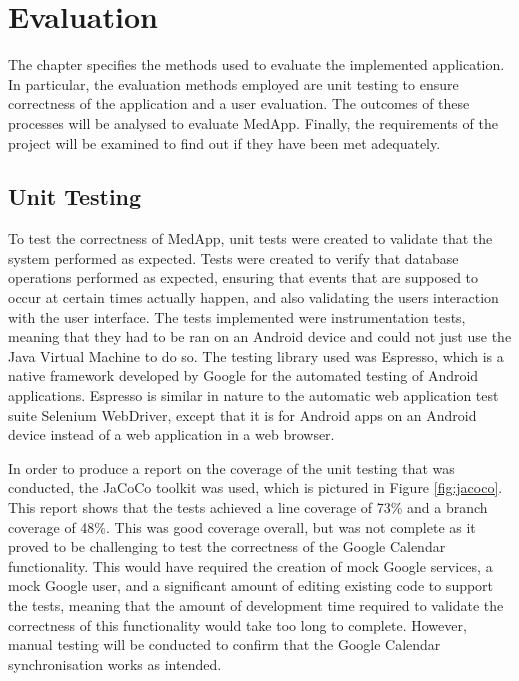\documentclass{l4proj}
\begin{document}
\chapter{Evaluation} 

The chapter specifies the methods used to evaluate the implemented application. In particular, the evaluation methods employed are unit testing to ensure correctness of the application and a user evaluation. The outcomes of these processes will be analysed to evaluate MedApp. Finally, the requirements of the project will be examined to find out if they have been met adequately.

\section{Unit Testing}

To test the correctness of MedApp, unit tests were created to validate that the system performed as expected. Tests were created to verify that database operations performed as expected, ensuring that events that are supposed to occur at certain times actually happen, and also validating the users interaction with the user interface. The tests implemented were instrumentation tests, meaning that they had to be ran on an Android device and could not just use the Java Virtual Machine to do so. The testing library used was Espresso, which is a native framework developed by Google for the automated testing of Android applications. Espresso is similar in nature to the automatic web application test suite Selenium WebDriver, except that it is for Android apps on an Android device instead of a web application in a web browser. 

In order to produce a report on the coverage of the unit testing that was conducted, the JaCoCo toolkit was used, which is pictured in Figure \ref{fig:jacoco}. This report shows that the tests achieved a line coverage of 73\% and a branch coverage of 48\%. This was good coverage overall, but was not complete as it proved to be challenging to test the correctness of the Google Calendar functionality. This would have required the creation of mock Google services, a mock Google user, and a significant amount of editing existing code to support the tests, meaning that the amount of development time required to validate the correctness of this functionality would take too long to complete. However, manual testing will be conducted to confirm that the Google Calendar synchronisation works as intended.
\end{document}

